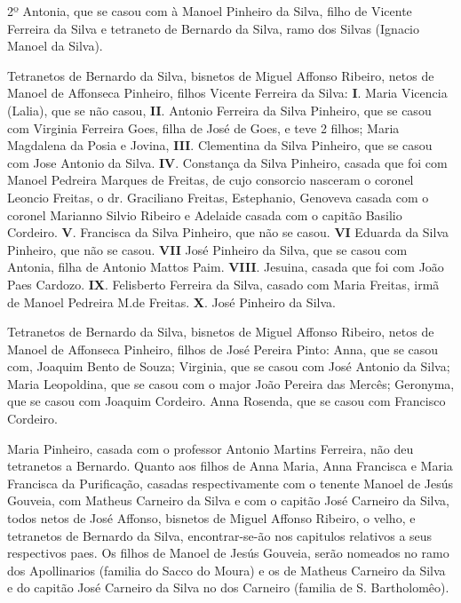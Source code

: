 \hspace{2em}2º Antonia, que se casou com à Manoel Pinheiro da Silva, filho de Vicente Ferreira da Silva e tetraneto de Bernardo da Silva, ramo dos Silvas (Ignacio Manoel da Silva).

Tetranetos de Bernardo da Silva, bisnetos de Miguel Affonso Ribeiro, netos de Manoel de Affonseca Pinheiro, filhos  Vicente Ferreira da Silva: \textbf{I}. Maria Vicencia (Lalia), que se não casou, \textbf{II}. Antonio Ferreira da Silva Pinheiro, que se casou com Virginia Ferreira Goes\label{vfgoes}, filha de José de Goes, e teve 2 filhos; Maria Magdalena\label{mmagdalena} da Posia e Jovina, \textbf{III}. Clementina da Silva Pinheiro, que se casou com Jose Antonio da Silva. \textbf{IV}. Constança da Silva Pinheiro, casada que foi com Manoel Pedreira Marques de Freitas, de cujo consorcio nasceram o coronel Leoncio Freitas, o dr. Graciliano Freitas, Estephanio, Genoveva casada com o coronel Marianno Silvio Ribeiro e Adelaide casada com o capitão Basilio Cordeiro. \textbf{V}. Francisca da Silva Pinheiro, que não se casou. \textbf{VI} Eduarda da Silva Pinheiro, que não se casou. \textbf{VII} José Pinheiro da Silva, que se casou com Antonia, filha de Antonio Mattos Paim. \textbf{VIII}. Jesuina,\label{jesuina} casada que foi com João Paes Cardozo. \textbf{IX}. Felisberto Ferreira da Silva, casado com Maria Freitas, irmã de Manoel Pedreira M.de Freitas. \textbf{X}. José Pinheiro da Silva.

Tetranetos de Bernardo da Silva, bisnetos de Miguel Affonso Ribeiro, netos de Manoel de Affonseca Pinheiro, filhos de José Pereira Pinto: Anna, que se casou com, Joaquim Bento de Souza; Virginia, que se casou com José Antonio da Silva; Maria Leopoldina, que se casou com o major João Pereira das Mercês; Geronyma, que se casou com Joaquim Cordeiro. Anna Rosenda, que se casou com Francisco Cordeiro.

Maria Pinheiro, casada com o professor Antonio Martins Ferreira, não deu tetranetos a Bernardo. Quanto aos filhos de Anna Maria, Anna Francisca e Maria Francisca da Purificação, casadas respectivamente com o tenente Manoel de Jesús Gouveia, com Matheus Carneiro da Silva e com o capitão José Carneiro da Silva, todos netos de José Affonso, bisnetos de Miguel Affonso Ribeiro, o velho, e tetranetos de Bernardo da Silva, encontrar-se-ão nos capitulos relativos a seus respectivos paes. Os filhos de Manoel de Jesús Gouveia, serão nomeados no ramo dos Apollinarios (familia do Sacco do Moura) e os de Matheus Carneiro da Silva e do capitão José Carneiro da Silva no dos Carneiro (familia de S. Bartholomêo).

